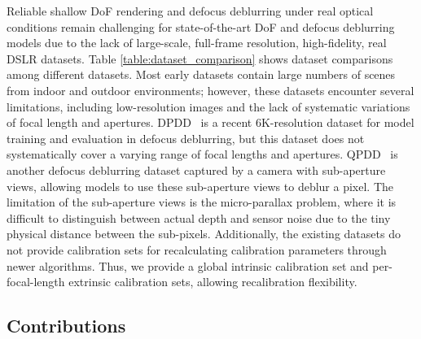 
Reliable shallow DoF rendering and defocus deblurring under real optical conditions remain challenging for state-of-the-art DoF and defocus deblurring models due to the lack of large-scale, full-frame resolution, high-fidelity, real DSLR datasets. Table \ref{table:dataset_comparison} shows dataset comparisons among different datasets. Most early datasets contain large numbers of scenes from indoor and outdoor environments; however, these datasets encounter several limitations, including low-resolution images and the lack of systematic variations of focal length and apertures. DPDD~\cite{abuolaim2019dpdd} is a recent 6K-resolution dataset for model training and evaluation in defocus deblurring, but this dataset does not systematically cover a varying range of focal lengths and apertures. QPDD~\cite{chen2025quad} is another defocus deblurring dataset captured by a camera with sub-aperture views, allowing models to use these sub-aperture views to deblur a pixel. The limitation of the sub-aperture views is the micro-parallax problem, where it is difficult to distinguish between actual depth and sensor noise due to the tiny physical distance between the sub-pixels. Additionally, the existing datasets do not provide calibration sets for recalculating calibration parameters through newer algorithms. Thus, we provide a global intrinsic calibration set and per-focal-length extrinsic calibration sets, allowing recalibration flexibility.



\subsection{Contributions}\label{subsec:contribution}

